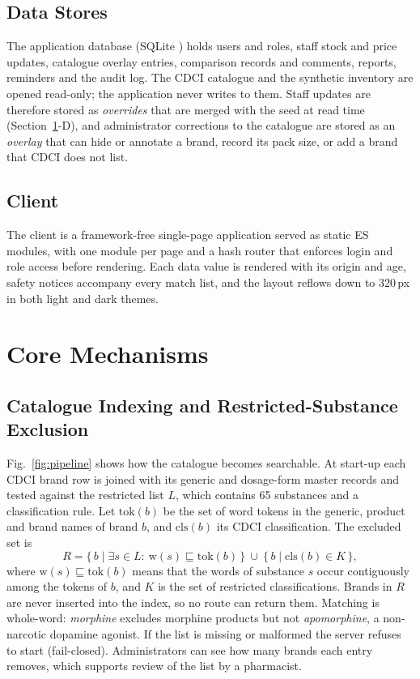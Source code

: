 \documentclass[conference]{IEEEtran}
\begin{document}
\subsection{Data Stores}
The application database (SQLite \cite{sqlite}) holds users and roles, staff stock and price updates, catalogue overlay entries, comparison records and comments, reports, reminders and the audit log. The CDCI catalogue and the synthetic inventory are opened read-only; the application never writes to them. Staff updates are therefore stored as \emph{overrides} that are merged with the seed at read time (Section~\ref{sec:mech}-D), and administrator corrections to the catalogue are stored as an \emph{overlay} that can hide or annotate a brand, record its pack size, or add a brand that CDCI does not list.

\subsection{Client}
The client is a framework-free single-page application served as static ES modules, with one module per page and a hash router that enforces login and role access before rendering. Each data value is rendered with its origin and age, safety notices accompany every match list, and the layout reflows down to 320\,px in both light and dark themes.

\section{Core Mechanisms}\label{sec:mech}

\subsection{Catalogue Indexing and Restricted-Substance Exclusion}
Fig.~\ref{fig:pipeline} shows how the catalogue becomes searchable. At start-up each CDCI brand row is joined with its generic and dosage-form master records and tested against the restricted list $L$, which contains 65 substances and a classification rule. Let $\mathrm{tok}(b)$ be the set of word tokens in the generic, product and brand names of brand $b$, and $\mathrm{cls}(b)$ its CDCI classification. The excluded set is
\begin{equation}
R=\{\,b \mid \exists s\in L:\ \mathrm{w}(s)\sqsubseteq \mathrm{tok}(b)\,\}\ \cup\ \{\,b \mid \mathrm{cls}(b)\in K\,\},
\label{eq:restricted}
\end{equation}
where $\mathrm{w}(s)\sqsubseteq \mathrm{tok}(b)$ means that the words of substance $s$ occur contiguously among the tokens of $b$, and $K$ is the set of restricted classifications. Brands in $R$ are never inserted into the index, so no route can return them. Matching is whole-word: \emph{morphine} excludes morphine products but not \emph{apomorphine}, a non-narcotic dopamine agonist. If the list is missing or malformed the server refuses to start (fail-closed). Administrators can see how many brands each entry removes, which supports review of the list by a pharmacist.
\end{document}

